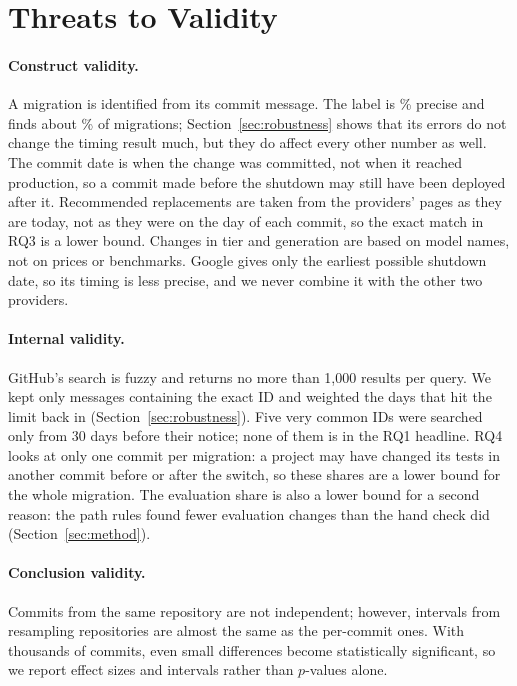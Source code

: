 \section{Threats to Validity}\label{sec:threats}

\paragraph{Construct validity.} A migration is identified from its commit message. The label is \Precision\% precise and finds about \Recall\% of migrations; Section~\ref{sec:robustness} shows that its errors do not change the timing result much, but they do affect every other number as well. The commit date is when the change was committed, not when it reached production, so a commit made before the shutdown may still have been deployed after it. Recommended replacements are taken from the providers' pages as they are today, not as they were on the day of each commit, so the exact match in RQ3 is a lower bound. Changes in tier and generation are based on model names, not on prices or benchmarks. Google gives only the earliest possible shutdown date, so its timing is less precise, and we never combine it with the other two providers.

\paragraph{Internal validity.} GitHub's search is fuzzy and returns no more than 1,000 results per query. We kept only messages containing the exact ID and weighted the days that hit the limit back in (Section~\ref{sec:robustness}). Five very common IDs were searched only from 30 days before their notice; none of them is in the RQ1 headline. RQ4 looks at only one commit per migration: a project may have changed its tests in another commit before or after the switch, so these shares are a lower bound for the whole migration. The evaluation share is also a lower bound for a second reason: the path rules found fewer evaluation changes than the hand check did (Section~\ref{sec:method}).

\paragraph{Conclusion validity.} Commits from the same repository are not independent; however, intervals from resampling repositories are almost the same as the per-commit ones. With thousands of commits, even small differences become statistically significant, so we report effect sizes and intervals rather than $p$-values alone.

